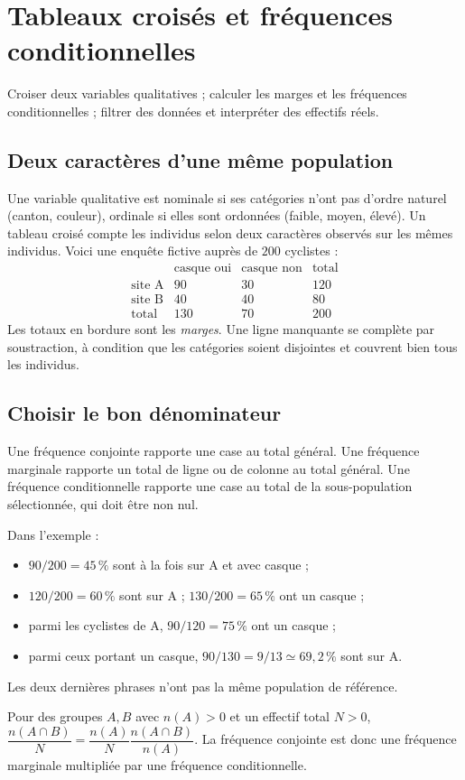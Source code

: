 \documentclass[../cours_2de.tex]{subfiles}
\begin{document}
\setcounter{chapter}{19}
\chapter{Tableaux croisés et fréquences conditionnelles}
\label{sec:ch20}
\begin{objectif}
Croiser deux variables qualitatives ; calculer les marges et les fréquences conditionnelles ; filtrer des données et interpréter des effectifs réels.
\end{objectif}
\section{Deux caractères d'une même population}
Une variable qualitative est nominale si ses catégories n'ont pas d'ordre naturel (canton, couleur), ordinale si elles sont ordonnées (faible, moyen, élevé).
Un tableau croisé compte les individus selon deux caractères observés sur les mêmes individus.
Voici une enquête fictive auprès de $200$ cyclistes :
\[
\begin{array}{c|rr|r}
 &\text{casque oui}&\text{casque non}&\text{total}\\\hline
\text{site A}&90&30&120\\
\text{site B}&40&40&80\\\hline
\text{total}&130&70&200
\end{array}
\]
Les totaux en bordure sont les \emph{marges}. Une ligne manquante se complète par soustraction, à condition que les catégories soient disjointes et couvrent bien tous les individus.
\section{Choisir le bon dénominateur}
\begin{definition}
Une fréquence conjointe rapporte une case au total général.
Une fréquence marginale rapporte un total de ligne ou de colonne au total général.
Une fréquence conditionnelle rapporte une case au total de la sous-population sélectionnée, qui doit être non nul.
\end{definition}
Dans l'exemple :
\begin{itemize}
\item $90/200=45\,\%$ sont à la fois sur A et avec casque ;
\item $120/200=60\,\%$ sont sur A ; $130/200=65\,\%$ ont un casque ;
\item parmi les cyclistes de A, $90/120=75\,\%$ ont un casque ;
\item parmi ceux portant un casque, $90/130=9/13\simeq69{,}2\,\%$ sont sur A.
\end{itemize}
Les deux dernières phrases n'ont pas la même population de référence.
\begin{demonstration}
Pour des groupes $A,B$ avec $n(A)>0$ et un effectif total $N>0$,
$\dfrac{n(A\cap B)}{N}
=\dfrac{n(A)}{N}\dfrac{n(A\cap B)}{n(A)}$.
La fréquence conjointe est donc une fréquence marginale multipliée par une fréquence conditionnelle.
\end{demonstration}
\end{document}
